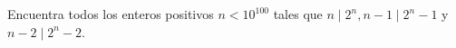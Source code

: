 \begin{problem}
    Encuentra todos los enteros positivos $n < 10^{100}$ tales que $n\mid 2^n, n-1\mid 2^n-1$ y $n-2 \mid 2^n-2$.
    \label{25EN2_2_8}
\end{problem}